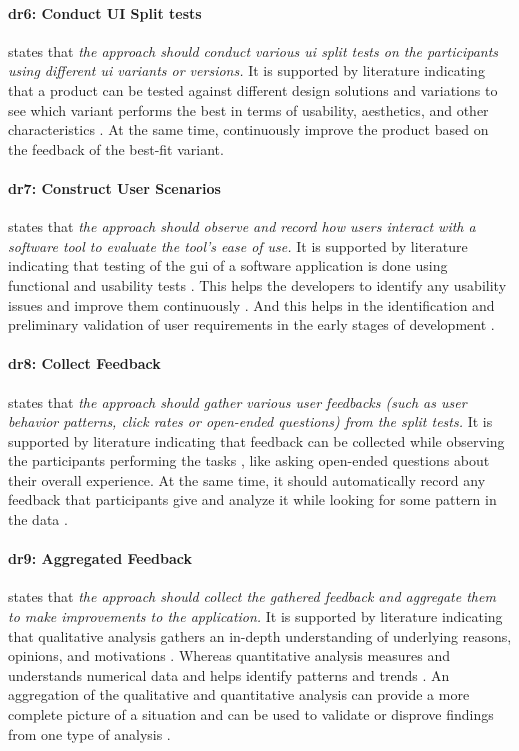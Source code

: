 \paragraph{\ac{dr}6: Conduct UI Split tests} states that \textit{the approach should conduct various \ac{ui} split tests on the participants using different \ac{ui} variants or versions.}
It is supported by literature indicating that a product can be tested against different design solutions and variations \cite{article:CE:fitzgerald} to see which variant performs the best in terms of usability, aesthetics, and other characteristics \cite{article:controlled:experiements}. 
At the same time, continuously improve \cite{article:CE:ros} the product based on the feedback of the best-fit variant.

\paragraph{\ac{dr}7: Construct User Scenarios} states that \textit{the approach should observe and record how users interact with a software tool to evaluate the tool's ease of use.} 
It is supported by literature indicating that testing of the \ac{gui} of a software application is done using functional and usability tests \cite{misc:usability:tasks}. 
This helps the developers to identify any usability issues \cite{article:tbup:kari} and improve them continuously \cite{article:prototyping:gould}.
And this helps in the identification and preliminary validation of user requirements in the early stages of development \cite{article:prototyping:weichbroth}. 


\paragraph{\ac{dr}8: Collect Feedback} states that \textit{the approach should gather various user feedbacks (such as user behavior patterns, click rates or open-ended questions) from the split tests.}
It is supported by literature indicating that feedback can be collected while observing the participants performing the tasks \cite{misc:qualitative:qualitative}, like asking open-ended questions about their overall experience.
At the same time, it should automatically record any feedback that participants give and analyze it while looking for some pattern in the data \cite{article:qqa:young}.

\paragraph{\ac{dr}9: Aggregated Feedback} states that \textit{the approach should collect the gathered feedback and aggregate them to make improvements to the application.} 
It is supported by literature indicating that qualitative analysis gathers an in-depth understanding of underlying reasons, opinions, and motivations \cite{misc:dsr:mayring}.
Whereas quantitative analysis measures and understands numerical data and helps identify patterns and trends \cite{article:qqa:young}.
An aggregation of the qualitative and quantitative analysis can provide a more complete picture of a situation and can be used to validate or disprove findings from one type of analysis \cite{article:qq:helena}.

